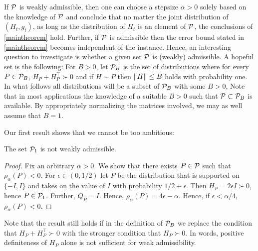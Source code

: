 If $\mathcal{P}$ is weakly admissible, then one can choose a stepsize $\alpha>0$ solely based on the knowledge of $\mathcal{P}$ and 
conclude that no matter the joint distribution of $(H_t,g_t)$, as long as the distribution of $H_t$ is an element of $\mathcal{P}$, the conclusions of \cref{maintheorem} hold. Further, if $\mathcal{P}$ is admissible then the error bound stated in  \cref{maintheorem} becomes independent of the instance.
Hence, an interesting question to investigate is whether a given set $\mathcal{P}$ is (weakly) admissible.
A hopeful set is the following:
For $B>0$, let $\mathcal{P}_B$ is the set of distributions where for every $P\in \mathcal{P}_B$, $H_P+H_P^\top\succ 0$ 
and if $H\sim P$ then $\left\| H\right\|\le B$ holds with probability one.
In what follows all distributions will be a subset of $\mathcal{P}_B$ with some $B>0$, 
Note that in most applications the knowledge of a suitable $B>0$ such that $\mathcal{P}\subset \mathcal{P}_B$ is available.
By appropriately normalizing the matrices involved, we may as well assume that $B=1$.

Our first result shows that we cannot be too ambitious:
\begin{proposition}
The set $\mathcal{P}_1$ is not weakly admissible.
\end{proposition}
\begin{proof}
Fix an arbitrary $\alpha>0$. We show that there exists $P\in \mathcal{P}$ such that $\rho_\alpha(P)<0$.
For $\epsilon \in (0,1/2)$ let $P$ be the distribution that is supported on $\{-I,I\}$ and takes on the value of $I$ with probability $1/2+\epsilon$. Then $H_P = 2\epsilon I \succ 0$, hence $P\in \mathcal{P}_1$. Further, $Q_P = I$.
Hence, $\rho_\alpha(P) = 4\epsilon-\alpha$. Hence, if $\epsilon<\alpha/4$, $\rho_\alpha(P)<0$.
\end{proof}
Note that the result still holds if in the definition of $\mathcal{P}_B$ we replace the condition that $H_P + H_P^\top \succ 0$ with the
stronger condition that $H_P\succ 0$. In words, positive definiteness of $H_P$ alone is not sufficient for weak admissibility.

